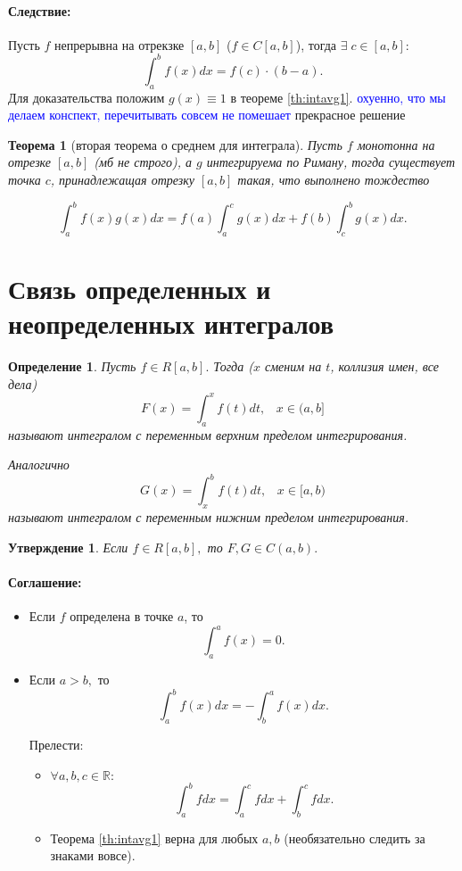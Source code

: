 \documentclass{article}
\theoremstyle{plain}
\newtheorem{theorem}{Теорема}
\newtheorem{claim}{Утверждение}
\newtheorem{definition}{Определение}
\theoremstyle{definition}
\theoremstyle{remark}
\renewcommand{\*}{\cdot}
\begin{document}
\paragraph{Следствие:} Пусть $f$ непрерывна на отрекзке $[a, b]$ ($f \in C[a, b]$), тогда $\exists \; c\in [a, b]$:
$$\int_a^b f(x)dx = f(c)\cdot (b-a).$$
Для доказательства положим $g(x) \equiv 1$ в теореме \ref{th:intavg1}.
\textcolor{blue}{охуенно, что мы делаем конспект, перечитывать совсем не помешает} прекрасное решение




\begin{theorem}[вторая теорема о среднем для интеграла]\label{th:intavg2}
Пусть $f$ монотонна на отрезке $[a, b]$ (мб  не строго), а $g$ интегрируема по Риману, тогда существует точка $c$, принадлежащая отрезку $[a, b]$ такая, что выполнено тождество

$$\int _a^b f(x)g(x)dx=f(a)\int_a^c g(x)dx + f(b)\int_c^b g(x)dx.$$

\end{theorem}


\section{Связь определенных и неопределенных интегралов}
\begin{definition}
Пусть $f\in R[a, b].$ Тогда  ($x$ сменим на $t$, коллизия имен, все дела)
\[
F(x) = \int_a^x f(t)dt,\;\;\;x\in(a,b]
\]
называют интегралом с переменным верхним пределом интегрирования.

Аналогично
\[
G(x) = \int_x^b f(t)dt,\;\;\;x\in[a,b)
\]
называют интегралом с переменным нижним пределом интегрирования.
\end{definition}
\begin{claim}
Если $f\in R[a, b],$ то $F, G \in C(a, b).$
\end{claim}

\paragraph{Соглашение:} 
\begin{itemize}
    \item Если $f$ определена в точке $a$, то $$\int_a^a f(x) = 0.$$
    \item Если $a > b,$ то $$\int_a^b f(x)dx = -\int_b^a f(x)dx.$$
    
Прелести: 
\begin{itemize}
    \item $\forall a, b, c \in \mathbb{R}:$ $$\int_a^b fdx = \int_a^c fdx + \int_b^c fdx.$$
    \item Теорема \ref{th:intavg1} верна для любых $ a, b$ (необязательно следить за знаками вовсе).
\end{itemize}
\end{itemize}
\end{document}
